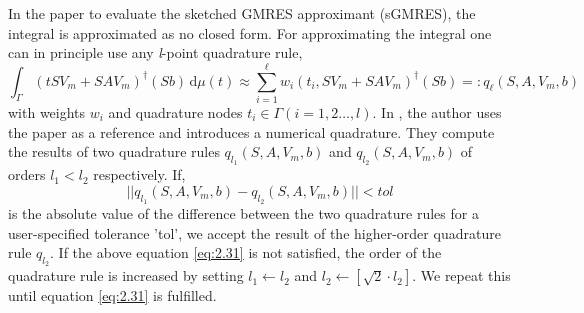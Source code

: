 In the paper \cite{41} to evaluate the sketched GMRES approximant (sGMRES), the integral is approximated as no closed form. For approximating the integral one can in principle use any \textit{l}-point quadrature rule,
\begin{equation}
    \int_{\Gamma} \left( tSV_m + SAV_m \right)^{\dagger} (Sb) \, \mathrm{d}\mu(t) \approx \sum_{i=1}^{\ell} w_i(t_i, SV_m + SAV_m)^{\dagger} (Sb) =: q_\ell(S, A, V_m, b)
    \label{eq:2.30}
\end{equation}
with weights $w_i$ and quadrature nodes $t_i \in \Gamma (i = 1, 2\dots, l)$. In \cite{41}, the author uses the paper \cite{52} as a reference and introduces a numerical quadrature. They compute the results of two quadrature rules $q_{l_1}(S, A, V_m, b)$ and $q_{l_2}(S, A, V_m, b)$ of orders $l_1 < l_2$ respectively. If,
\begin{equation}
    ||q_{l_1}(S, A, V_m, b) - q_{l_2}(S, A, V_m, b)|| < tol
    \label{eq:2.31}
\end{equation}
is the absolute value of the difference between the two quadrature rules for a user-specified tolerance 'tol', we accept the result of the higher-order quadrature rule $q_{l_2}$. If the above equation \eqref{eq:2.31} is not satisfied, the order of the quadrature rule is increased by setting $l_1 \leftarrow l_2$ and $l_2 \leftarrow [\sqrt{2} \cdot l_2]$. We repeat this until equation \eqref{eq:2.31} is fulfilled.

